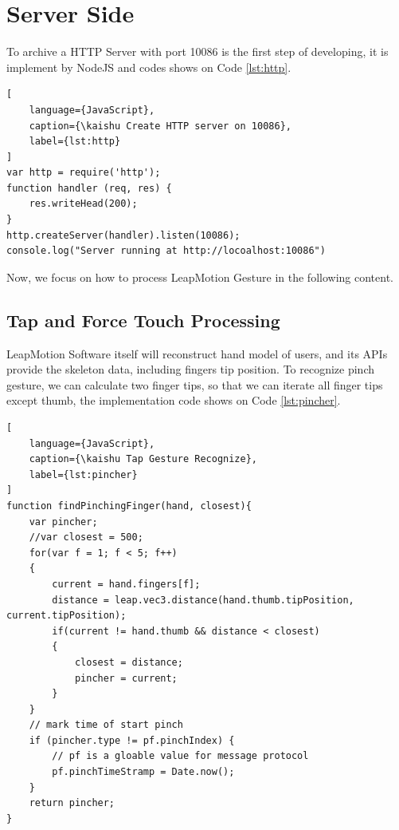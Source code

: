 \section{Server Side}
To archive a HTTP Server with port 10086 is the first step of developing, it is implement by NodeJS and codes shows on Code \ref{lst:http}.
\begin{lstlisting}[
    language={JavaScript},
    caption={\kaishu Create HTTP server on 10086},
    label={lst:http}
]
var http = require('http');
function handler (req, res) {
    res.writeHead(200);
}
http.createServer(handler).listen(10086);
console.log("Server running at http://locoalhost:10086")
\end{lstlisting}

Now, we focus on how to process LeapMotion Gesture in the following content.

\subsection{Tap and Force Touch Processing}

LeapMotion Software itself will reconstruct hand model of users, and its APIs provide the skeleton data, including fingers tip position.
To recognize pinch gesture, we can calculate two finger tips, so that we can iterate all finger tips except thumb, the implementation code shows on Code \ref{lst:pincher}.

\begin{lstlisting}[
    language={JavaScript},
    caption={\kaishu Tap Gesture Recognize},
    label={lst:pincher}
]
function findPinchingFinger(hand, closest){
    var pincher;
    //var closest = 500;
    for(var f = 1; f < 5; f++)
    {
        current = hand.fingers[f];
        distance = leap.vec3.distance(hand.thumb.tipPosition, current.tipPosition);
        if(current != hand.thumb && distance < closest)
        {
            closest = distance;
            pincher = current;
        }
    }
    // mark time of start pinch
    if (pincher.type != pf.pinchIndex) {
        // pf is a gloable value for message protocol
        pf.pinchTimeStramp = Date.now();
    }
    return pincher;
}
\end{lstlisting}

